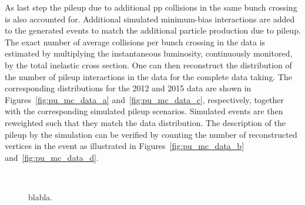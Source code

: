 As last step the pileup due to additional pp collisions in the same bunch crossing is also accounted for.
Additional simulated minimum-bias interactions are added to the generated events to match the additional particle production due to pileup.
The exact number of average collisions per bunch crossing in the data is estimated by multiplying the instantaneous luminosity, continuously monitored, by the total inelastic cross section.
One can then reconstruct the distribution of the number of pileup interactions in the data for the complete data taking.
The corresponding distributions for the 2012 and 2015 data are shown in Figures~\ref{fig:pu_mc_data_a} and~\ref{fig:pu_mc_data_c}, respectively, together with the corresponding simulated pileup scenarios.
Simulated events are then reweighted such that they match the data distribution. The description of the pileup by the simulation can be verified by counting the number of reconstructed vertices in the event as illustrated in Figures~\ref{fig:pu_mc_data_b} and~\ref{fig:pu_mc_data_d}.\\

\begin{figure}[!htb]
\centering
{}
\\
\caption{blabla.}
\label{fig:pu_mc_data}
\end{figure}

